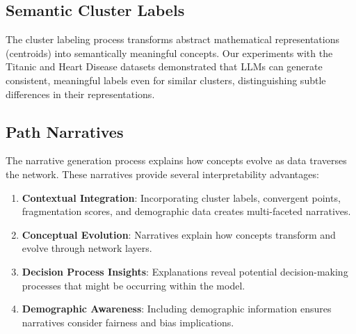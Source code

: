 \subsection{Semantic Cluster Labels}

The cluster labeling process transforms abstract mathematical representations (centroids) into semantically meaningful concepts. Our experiments with the Titanic and Heart Disease datasets demonstrated that LLMs can generate consistent, meaningful labels even for similar clusters, distinguishing subtle differences in their representations.




\subsection{Path Narratives}

The narrative generation process explains how concepts evolve as data traverses the network. These narratives provide several interpretability advantages:

\begin{enumerate}
    \item \textbf{Contextual Integration}: Incorporating cluster labels, convergent points, fragmentation scores, and demographic data creates multi-faceted narratives.
    \item \textbf{Conceptual Evolution}: Narratives explain how concepts transform and evolve through network layers.
    \item \textbf{Decision Process Insights}: Explanations reveal potential decision-making processes that might be occurring within the model.
    \item \textbf{Demographic Awareness}: Including demographic information ensures narratives consider fairness and bias implications.
\end{enumerate}

%  
% 


